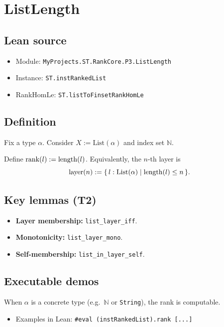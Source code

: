 \section{ListLength}
\label{sec:ex-listlength}

\subsection{Lean source}
\begin{itemize}
\item Module: \texttt{MyProjects.ST.RankCore.P3.ListLength}
\item Instance: \texttt{ST.instRankedList}
\item RankHomLe: \texttt{ST.listToFinsetRankHomLe}
\end{itemize}

\subsection{Definition}
Fix a type $\alpha$. Consider $X := \mathrm{List}(\alpha)$ and index set $\mathbb{N}$.
\begin{definition}
Define $\operatorname{rank}(l) := \mathrm{length}(l)$.
Equivalently, the $n$-th layer is
\[
  \operatorname{layer}(n) := \{\, l : \mathrm{List}(\alpha) \mid \mathrm{length}(l) \le n \,\}.
\]
\end{definition}

\subsection{Key lemmas (T2)}
\begin{itemize}
\item \textbf{Layer membership:} \texttt{list\_layer\_iff}.
\item \textbf{Monotonicity:} \texttt{list\_layer\_mono}.
\item \textbf{Self-membership:} \texttt{list\_in\_layer\_self}.
\end{itemize}

\subsection{Executable demos}
When $\alpha$ is a concrete type (e.g.\ $\mathbb{N}$ or \texttt{String}), the rank is computable.
\begin{itemize}
\item Examples in Lean: \texttt{#eval (instRankedList).rank [...]}
\end{itemize}

